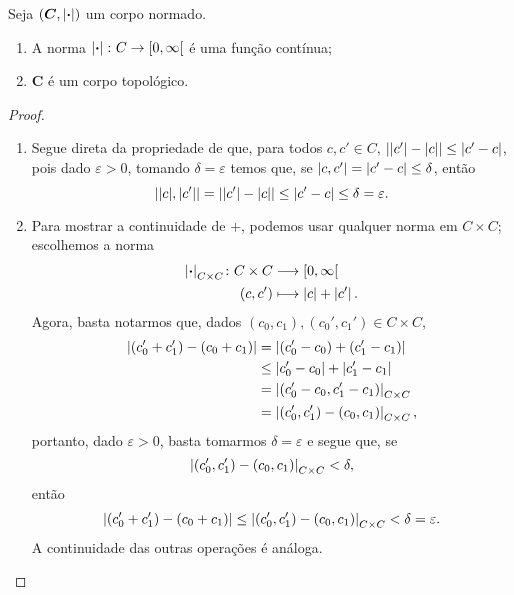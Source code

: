 \begin{proposition}
Seja $(\bm C,\left\vert{\bm{\cdot}}\right\vert)$ um corpo normado.
	\begin{enumerate}
	\item A norma $\left\vert{\bm{\cdot}}\right\vert\colon C \to \left[{0},{\infty}\right[$ é uma função contínua;
	\item $\bm C$ é um corpo topológico.
	\end{enumerate}
\end{proposition}
\begin{proof}
	\begin{enumerate}
	\item Segue direta da propriedade de que, para todos $c,c' \in C$, $\left\vert{\left\vert{c'}\right\vert-\left\vert{c}\right\vert}\right\vert \leq \left\vert{c'-c}\right\vert$, pois dado $\varepsilon > 0$, tomando $\delta=\varepsilon$ temos que, se $\left\vert{c},{c'}\right\vert = \left\vert{c'-c}\right\vert \leq \delta$, então
		\begin{equation*}
		\left\vert{\left\vert{c}\right\vert},{\left\vert{c'}\right\vert}\right\vert = \left\vert{\left\vert{c'}\right\vert-\left\vert{c}\right\vert}\right\vert \leq \left\vert{c'-c}\right\vert \leq \delta = \varepsilon.
		\end{equation*}

	\item Para mostrar a continuidade de $+$, podemos usar qualquer norma em $C \times C$; escolhemos a norma
		\begin{align*}
		{\left\vert{\bm{\cdot}}\right\vert_{C \times C}}\colon {C \times C} &\longrightarrow {\left[{0},{\infty}\right[} \\{(c,c')} &\longmapsto \left\vert{c}\right\vert+\left\vert{c'}\right\vert.
		\end{align*}
Agora, basta notarmos que, dados $(c_0,c_1),(c_0',c_1') \in C \times C$,
	\begin{align*}
	\left\vert{(c_0'+c_1') - (c_0+c_1)}\right\vert &= \left\vert{(c_0' - c_0) + (c_1'-c_1)}\right\vert \\
		&\leq \left\vert{c_0'-c_0}\right\vert + \left\vert{c_1'-c_1}\right\vert \\
		&= \left\vert{(c_0'-c_0,c_1'-c_1)}\right\vert_{C \times C} \\
		&= \left\vert{(c_0',c_1')-(c_0,c_1)}\right\vert_{C \times C},
	\end{align*}
portanto, dado $\varepsilon>0$, basta tomarmos $\delta=\varepsilon$ e segue que, se
	\begin{equation*}
		\left\vert{(c_0',c_1')-(c_0,c_1)}\right\vert_{C \times C} < \delta,
	\end{equation*}
então
	\begin{equation*}
	\left\vert{(c_0'+c_1') - (c_0+c_1)}\right\vert \leq \left\vert{(c_0',c_1')-(c_0,c_1)}\right\vert_{C \times C} < \delta=\varepsilon.
	\end{equation*}
A continuidade das outras operações é análoga.
	\end{enumerate}
\end{proof}

